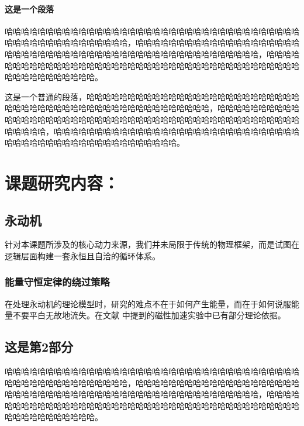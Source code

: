 \documentclass[a4paper,zihao=-4,AutoFakeBold,AutoFakeSlant]{ctexart}
\begin{document}
\paragraph{这是一个段落}

哈哈哈哈哈哈哈哈哈哈哈哈哈哈哈哈哈哈哈哈哈哈哈哈哈哈哈哈哈哈哈哈哈哈哈哈哈哈哈哈哈哈哈哈哈哈哈哈哈哈哈，哈哈哈哈哈哈哈哈哈哈哈哈哈哈哈哈哈哈哈哈哈哈哈哈哈哈哈哈哈哈哈哈哈哈哈哈哈哈哈哈哈哈哈哈哈哈哈哈哈哈哈，哈哈哈哈哈哈哈哈哈哈哈哈哈哈哈哈哈哈哈哈哈哈哈哈哈哈哈哈哈哈哈哈哈哈哈哈哈哈哈哈哈哈哈哈哈哈哈哈哈哈哈。

这是一个普通的段落，哈哈哈哈哈哈哈哈哈哈哈哈哈哈哈哈哈哈哈哈哈哈哈哈哈哈哈哈哈哈哈哈哈哈哈哈哈哈哈哈哈哈哈哈哈哈哈哈哈哈哈，哈哈哈哈哈哈哈哈哈哈哈哈哈哈哈哈哈哈哈哈哈哈哈哈哈哈哈哈哈哈哈哈哈哈哈哈哈哈哈哈哈哈哈哈哈哈哈哈哈哈哈，哈哈哈哈哈哈哈哈哈哈哈哈哈哈哈哈哈哈哈哈哈哈哈哈哈哈哈哈哈哈哈哈哈哈哈哈哈哈哈哈哈哈哈哈哈哈哈哈哈哈哈。


\section{课题研究内容：}

\subsection{永动机} \label{perpetual_motion}

针对本课题所涉及的核心动力来源，我们并未局限于传统的物理框架，而是试图在逻辑层面构建一套永恒且自洽的循环体系。

\subsubsection{能量守恒定律的绕过策略}

在处理永动机的理论模型时，研究的难点不在于如何产生能量，而在于如何说服能量不要平白无故地流失。在文献 \cite{MAGNET_CAR} 中提到的磁性加速实验中已有部分理论依据。

\subsection{这是第2部分}

哈哈哈哈哈哈哈哈哈哈哈哈哈哈哈哈哈哈哈哈哈哈哈哈哈哈哈哈哈哈哈哈哈哈哈哈哈哈哈哈哈哈哈哈哈哈哈哈哈哈哈，哈哈哈哈哈哈哈哈哈哈哈哈哈哈哈哈哈哈哈哈哈哈哈哈哈哈哈哈哈哈哈哈哈哈哈哈哈哈哈哈哈哈哈哈哈哈哈哈哈哈哈，哈哈哈哈哈哈哈哈哈哈哈哈哈哈哈哈哈哈哈哈哈哈哈哈哈哈哈哈哈哈哈哈哈哈哈哈哈哈哈哈哈哈哈哈哈哈哈哈哈哈哈。
\end{document}
